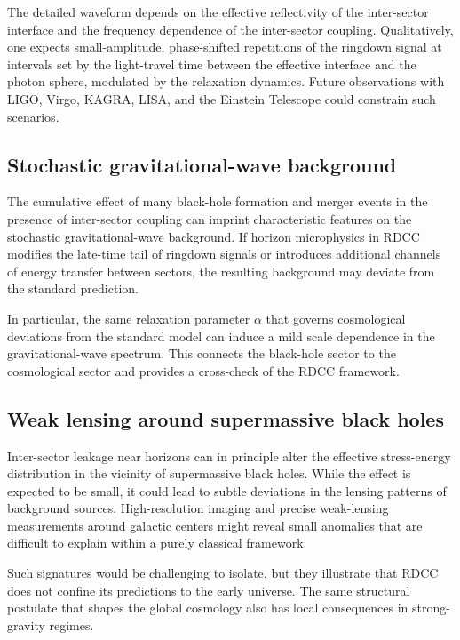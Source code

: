 \documentclass[11pt,a4paper]{article}
\begin{document}
The detailed waveform depends on the effective reflectivity of the inter-sector interface and the 
frequency dependence of the inter-sector coupling. Qualitatively, one expects small-amplitude, 
phase-shifted repetitions of the ringdown signal at intervals set by the light-travel time between 
the effective interface and the photon sphere, modulated by the relaxation dynamics. 
Future observations with LIGO, Virgo, KAGRA, LISA, and the Einstein Telescope could 
constrain such scenarios.

\subsection{Stochastic gravitational-wave background}

The cumulative effect of many black-hole formation and merger events in the presence of 
inter-sector coupling can imprint characteristic features on the stochastic gravitational-wave 
background. If horizon microphysics in RDCC modifies the late-time tail of ringdown signals or 
introduces additional channels of energy transfer between sectors, the resulting background may 
deviate from the standard prediction.

In particular, the same relaxation parameter \(\alpha\) that governs cosmological deviations from 
the standard model can induce a mild scale dependence in the gravitational-wave spectrum. 
This connects the black-hole sector to the cosmological sector and provides a cross-check of 
the RDCC framework.

\subsection{Weak lensing around supermassive black holes}

Inter-sector leakage near horizons can in principle alter the effective stress-energy distribution 
in the vicinity of supermassive black holes. While the effect is expected to be small, it could lead 
to subtle deviations in the lensing patterns of background sources. High-resolution imaging and 
precise weak-lensing measurements around galactic centers might reveal small anomalies that 
are difficult to explain within a purely classical framework.

Such signatures would be challenging to isolate, but they illustrate that RDCC does not confine 
its predictions to the early universe. The same structural postulate that shapes the global 
cosmology also has local consequences in strong-gravity regimes.
\end{document}
